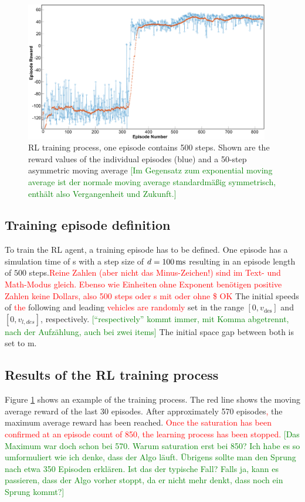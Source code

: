 \documentclass[review]{elsarticle}
\providecommand{\red}[1]{\textcolor{red}{#1}}
\providecommand{\green}[1]{\textcolor{green}{#1}}
\providecommand{\martin}[1]{\red{#1}} %
\providecommand{\martinc}[1]{\green{[#1]}} %
\providecommand{\sub}[1]{_{\mathrm{#1}}}  %
\providecommand{\3}{{\ss}}
\begin{document}
\begin{figure}
	\centering
	\includegraphics[width=0.95\textwidth]{images/Training}
	\caption{RL training process, one episode contains 500
          steps. Shown are the reward values of the individual
          episodes (blue) and a 50-step asymmetric moving average
          \martinc{Im Gegensatz zum exponential moving average ist der
          normale moving average standardm\"a\3ig symmetrisch,
          enth\"alt also Vergangenheit und Zukunft.}}
	\label{fig:training}
\end{figure}

\subsection{Training episode definition}

To train the RL agent, a training episode has to be defined. One
episode has a simulation time of \unit[50]{s} with a step size of
$d=\unit[100]{ms}$ resulting in an episode length of $500$
steps.\martin{Reine Zahlen (aber nicht das Minus-Zeichen!) sind im Text- und Math-Modus gleich. Ebenso
  wie Einheiten ohne Exponent ben\"otigen positive Zahlen keine Dollars, also 500
  steps oder \unit[50]{s} mit oder ohne \$ OK}   The initial
speeds of \martin{the} following and leading \martin{vehicles are
  randomly}  set in the range $[0,v\sub{des}]$ and $[0,v_{l,des}]$,
respectively. \martinc{``respectively'' kommt immer, mit Komma
  abgetrennt, nach der Aufz\"ahlung, auch bei zwei items} The initial
space gap between both is set to \unit[120]{m}. 

\subsection{Results of the RL training process}

Figure \ref{fig:training} shows an example of the training
process. The red line shows the moving average reward of the last 30
episodes. After approximately 570 episodes\martin{,} the maximum
average reward has been reached. \martin{Once the saturation has been
confirmed at an episode count of 850, the learning
process has been stopped.} \martinc{Das Maximum war
  doch schon bei 570. Warum saturation erst bei 850? Ich habe es so
  umformuliert wie ich denke, dass der Algo l\"auft. \"Ubrigens sollte
  man den Sprung nach etwa 350 Episoden erkl\"aren. Ist das der
  typische Fall? Falls ja, kann es passieren, dass der Algo vorher
  stoppt, da er nicht mehr denkt, dass noch ein Sprung kommt?}
\end{document}
